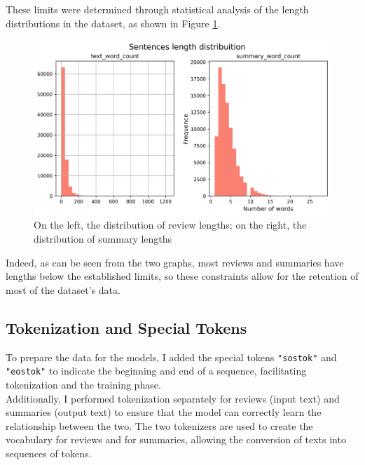 These limits were determined through statistical analysis of the length distributions in the dataset, as shown in Figure \ref{fig:dataset_length_distribuition}.
\begin{figure}[H]
    \centering
    \includegraphics[width=1\textwidth]{media/dataset_length_distribuition.png}
    \caption{On the left, the distribution of review lengths; on the right, the distribution of summary lengths}
    \label{fig:dataset_length_distribuition}
\end{figure}
Indeed, as can be seen from the two graphs, most reviews and summaries have lengths below the established limits, so these constraints allow for the retention of most of the dataset's data.

\subsection{Tokenization and Special Tokens}
To prepare the data for the models, I added the special tokens \texttt{"sostok"} and \texttt{"eostok"} to indicate the beginning and end of a sequence, facilitating tokenization and the training phase.\\
Additionally, I performed tokenization separately for reviews (input text) and summaries (output text) to ensure that the model can correctly learn the relationship between the two.
The two tokenizers are used to create the vocabulary for reviews and for summaries, allowing the conversion of texts into sequences of tokens.
